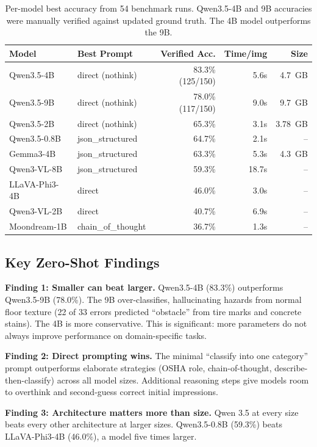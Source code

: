 \documentclass[12pt, a4paper]{article}
\begin{document}
\begin{table}[H]
\centering
\begin{tabular}{llrrr}
\toprule
\textbf{Model} & \textbf{Best Prompt} & \textbf{Verified Acc.} & \textbf{Time/img} & \textbf{Size} \\
\midrule
Qwen3.5-4B & direct (nothink) & 83.3\% (125/150) & 5.6s & 4.7~GB \\
Qwen3.5-9B & direct (nothink) & 78.0\% (117/150) & 9.0s & 9.7~GB \\
Qwen3.5-2B & direct (nothink) & 65.3\% & 3.1s & 3.78~GB \\
Qwen3.5-0.8B & json\_structured & 64.7\% & 2.1s & -- \\
Gemma3-4B & json\_structured & 63.3\% & 5.3s & 4.3~GB \\
Qwen3-VL-8B & json\_structured & 59.3\% & 18.7s & -- \\
LLaVA-Phi3-4B & direct & 46.0\% & 3.0s & -- \\
Qwen3-VL-2B & direct & 40.7\% & 6.9s & -- \\
Moondream-1B & chain\_of\_thought & 36.7\% & 1.3s & -- \\
\bottomrule
\end{tabular}
\caption{Per-model best accuracy from 54 benchmark runs. Qwen3.5-4B and 9B accuracies were manually verified against updated ground truth. The 4B model outperforms the 9B.}
\label{tab:benchmark}
\end{table}

\subsection{Key Zero-Shot Findings}

\textbf{Finding 1: Smaller can beat larger.} Qwen3.5-4B (83.3\%) outperforms Qwen3.5-9B (78.0\%). The 9B over-classifies, hallucinating hazards from normal floor texture (22 of 33 errors predicted ``obstacle'' from tire marks and concrete stains). The 4B is more conservative. This is significant: more parameters do not always improve performance on domain-specific tasks.

\textbf{Finding 2: Direct prompting wins.} The minimal ``classify into one category'' prompt outperforms elaborate strategies (OSHA role, chain-of-thought, describe-then-classify) across all model sizes. Additional reasoning steps give models room to overthink and second-guess correct initial impressions.

\textbf{Finding 3: Architecture matters more than size.} Qwen 3.5 at every size beats every other architecture at larger sizes. Qwen3.5-0.8B (59.3\%) beats LLaVA-Phi3-4B (46.0\%), a model five times larger.
\end{document}
